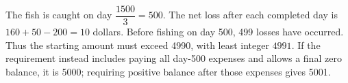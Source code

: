 The fish is caught on day $\dfrac{1500}{3}=500$. The net loss after each completed day is $160+50-200=10$ dollars. Before fishing on day 500, 499 losses have occurred. Thus the starting amount must exceed 4990, with least integer $\boxed{4991}$. If the requirement instead includes paying all day-500 expenses and allows a final zero balance, it is 5000; requiring positive balance after those expenses gives 5001.
